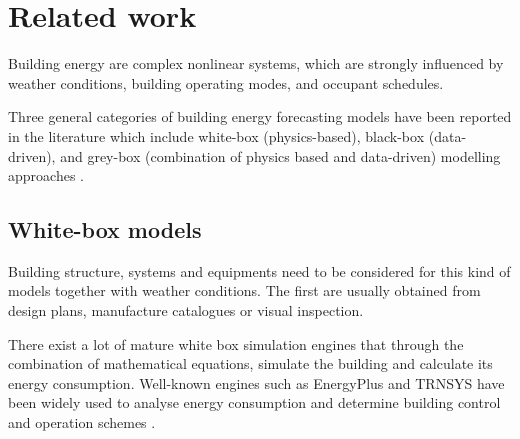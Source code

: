 \documentclass[10pt, conference, compsocconf]{IEEEtran}
\begin{document}






\section{Related work}

Building energy are complex nonlinear systems, which are strongly influenced by weather conditions, building operating modes, and occupant schedules.

Three general categories of building energy forecasting models have been reported in the literature which include white-box (physics-based), black-box (data-driven), and grey-box (combination of physics based and data-driven) modelling approaches \cite{li2014review}.

\subsection{White-box models}


Building structure, systems and equipments need to be considered for this kind of models together with weather conditions. The first are usually obtained from design plans, manufacture catalogues or visual inspection.

There exist a lot of mature white box simulation engines that through the combination of mathematical equations, simulate the building and calculate its energy consumption. Well-known engines such as EnergyPlus \cite{crawley2001energyplus} and TRNSYS \cite{TRNSYS} have been widely used to analyse energy consumption and determine building control and operation schemes \cite{crawley2008contrasting}.
\end{document}
